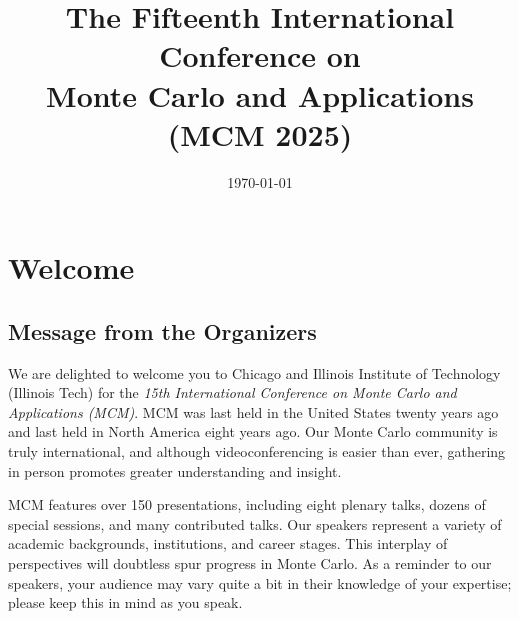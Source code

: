 \title{The Fifteenth International Conference on \\
	Monte Carlo and Applications \\
	(MCM 2025) }
\date{\today}
\maketitle


\tableofcontents


\chapter{Welcome}

\section{Message from the Organizers}


We are delighted to welcome you to Chicago and Illinois Institute of Technology (Illinois Tech) for the \emph{15th International Conference on Monte Carlo and Applications (MCM)}. MCM was last held in the United States twenty years ago and last held in North America eight years ago.  Our Monte Carlo community is truly international, and although videoconferencing is easier than ever, gathering in person promotes greater understanding and insight.

MCM features over 150 presentations, including eight plenary talks,  dozens of special sessions, and many contributed talks.  Our speakers represent a variety of academic backgrounds, institutions, and career stages.  This interplay of perspectives will doubtless spur progress in Monte Carlo.  As a reminder to our speakers, your audience may vary quite a bit in their knowledge of your expertise; please keep this in mind as you speak.

